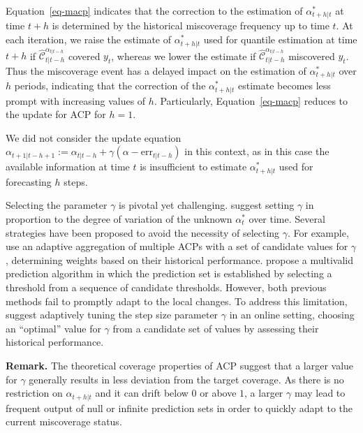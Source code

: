\documentclass[
  11pt,
  a4paper,
]{article}
\theoremstyle{plain}
\theoremstyle{remark}
\begin{document}
Equation~\ref{eq-macp} indicates that the correction to the estimation
of \(\alpha_{t+h|t}^{*}\) at time \(t+h\) is determined by the
historical miscoverage frequency up to time \(t\). At each iteration, we
raise the estimate of \(\alpha_{t+h|t}^{*}\) used for quantile
estimation at time \(t+h\) if
\(\hat{\mathcal{C}}_{t|t-h}^{\alpha_{t|t-h}}\) covered \(y_t\), whereas
we lower the estimate if \(\hat{\mathcal{C}}_{t|t-h}^{\alpha_{t|t-h}}\)
miscovered \(y_t\). Thus the miscoverage event has a delayed impact on
the estimation of \(\alpha_{t+h|t}^{*}\) over \(h\) periods, indicating
that the correction of the \(\alpha_{t+h|t}^{*}\) estimate becomes less
prompt with increasing values of \(h\). Particularly,
Equation~\ref{eq-macp} reduces to the update for ACP for \(h=1\).

We did not consider the update equation
\(\alpha_{t+1|t-h+1} := \alpha_{t|t-h} + \gamma\left(\alpha - \mathrm{err}_{t|t-h}\right)\)
in this context, as in this case the available information at time \(t\)
is insufficient to estimate \(\alpha_{t+h|t}^{*}\) used for forecasting
\(h\) steps.

Selecting the parameter \(\gamma\) is pivotal yet challenging.
\textcite{gibbs2021} suggest setting \(\gamma\) in proportion to the
degree of variation of the unknown \(\alpha_{t}^{*}\) over time. Several
strategies have been proposed to avoid the necessity of selecting
\(\gamma\). For example, \textcite{zaffran2022} use an adaptive
aggregation of multiple ACPs with a set of candidate values for
\(\gamma\) , determining weights based on their historical performance.
\textcite{bastani2022} propose a multivalid prediction algorithm in
which the prediction set is established by selecting a threshold from a
sequence of candidate thresholds. However, both previous methods fail to
promptly adapt to the local changes. To address this limitation,
\textcite{gibbs2024} suggest adaptively tuning the step size parameter
\(\gamma\) in an online setting, choosing an ``optimal'' value for
\(\gamma\) from a candidate set of values by assessing their historical
performance.

\textbf{Remark.} The theoretical coverage properties of ACP suggest that
a larger value for \(\gamma\) generally results in less deviation from
the target coverage. As there is no restriction on \(\alpha_{t+h|t}\)
and it can drift below \(0\) or above \(1\), a larger \(\gamma\) may
lead to frequent output of null or infinite prediction sets in order to
quickly adapt to the current miscoverage status.
\end{document}
